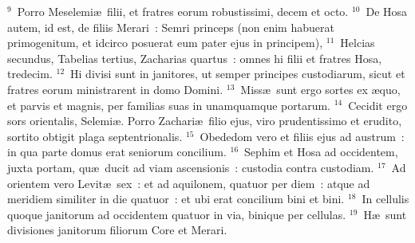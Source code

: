 ${}^{9}$~Porro Meselemi\ae\ filii, et fratres eorum robustissimi, decem et octo.
${}^{10}$~De Hosa autem, id est, de filiis Merari~: Semri princeps (non enim habuerat primogenitum, et idcirco posuerat eum pater ejus in principem),
${}^{11}$~Helcias secundus, Tabelias tertius, Zacharias quartus~: omnes hi filii et fratres Hosa, tredecim.
${}^{12}$~Hi divisi sunt in janitores, ut semper principes custodiarum, sicut et fratres eorum ministrarent in domo Domini.
${}^{13}$~Miss\ae\ sunt ergo sortes ex \ae quo, et parvis et magnis, per familias suas in unamquamque portarum.
${}^{14}$~Cecidit ergo sors orientalis, Selemi\ae . Porro Zachari\ae\ filio ejus, viro prudentissimo et erudito, sortito obtigit plaga septentrionalis.
${}^{15}$~Obededom vero et filiis ejus ad austrum~: in qua parte domus erat seniorum concilium.
${}^{16}$~Sephim et Hosa ad occidentem, juxta portam, qu\ae\ ducit ad viam ascensionis~: custodia contra custodiam.
${}^{17}$~Ad orientem vero Levit\ae\ sex~: et ad aquilonem, quatuor per diem~: atque ad meridiem similiter in die quatuor~: et ubi erat concilium bini et bini.
${}^{18}$~In cellulis quoque janitorum ad occidentem quatuor in via, binique per cellulas.
${}^{19}$~H\ae\ sunt divisiones janitorum filiorum Core et Merari.


